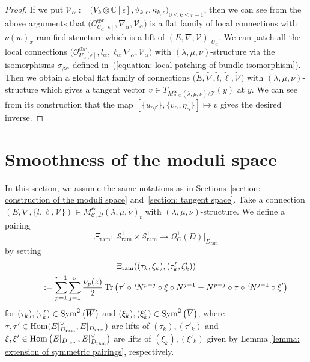 \documentclass[pdftex]{sigma}
\numberwithin{equation}{section}
\newcommand{\Tr}{\mathop{\rm Tr}\nolimits}
\newcommand\Hom{\mathop{\rm Hom}\nolimits}
\newcommand{\Sym}{\mathop{\rm Sym}\nolimits}
\newcommand{\balpha}{\boldsymbol \alpha}
\begin{document}
\begin{proof}
If we put
${\mathcal V}_{\alpha}:=
\big(\overline{V}_k\otimes\mathbb{C}[\epsilon],\vartheta_{k,\epsilon},\kappa_{k,\epsilon}\big)_{0\leq k\leq r-1}$,
then we can see from the above arguments that
$\big({\mathcal O}_{U_{\alpha}[\epsilon]}^{\oplus r} ,
\nabla_{\alpha} , {\mathcal V}_{\alpha}\big)$
is a flat family of local connections with $\nu(w)_x$-ramified structure which is a lift of
$(E,\nabla,{\mathcal V})|_{U_{\alpha}}$.
We can patch all the local connections
$\big({\mathcal O}_{U_{\alpha}[\epsilon]}^{\oplus r} ,l_{\alpha},\ell_{\alpha}
\nabla_{\alpha} , {\mathcal V}_{\alpha}\big)$
with $(\lambda,\mu,\nu)$-structure
via the isomorphisms $\sigma_{\beta\alpha}$
defined in~(\ref{equation: local patching of bundle isomorphism}).
Then we obtain a global flat family of connections
$\big(\tilde{E},\tilde{\nabla},\tilde{l},\tilde{\ell},\tilde{\mathcal V}\big)$
with $(\lambda,\mu,\nu)$-structure
which gives a tangent vector
$v\in T_{M^{\balpha}_{{\mathcal C},{\mathcal D}}(\lambda,\tilde{\mu},\tilde{\nu})/{\mathcal T}}(y)$
at $y$.
We can see from its construction that
the map
$[\{u_{\alpha\beta}\},\{v_{\alpha},\eta_{\alpha}\}]\mapsto v$
gives the desired inverse.
\end{proof}

\section{Smoothness of the moduli space}\label{section: smoothness of the moduli}

In this section, we assume the same notations as in
Sections~\ref{section: construction of the moduli space}
and~\ref{section: tangent space}.
Take a connection
$(E,\nabla,\{ l,\ell,{\mathcal V}\})
\in M^{\balpha}_{{\mathcal C},{\mathcal D}}(\lambda,\tilde{\mu},\tilde{\nu})_t$
with $(\lambda,\mu,\nu)$-structure.
We define a pairing
\[
 \Xi_{\mathrm{ram}} \colon \
 {\mathcal S}^1_{\mathrm{ram}} \times {\mathcal S}^1_{\mathrm{ram}}
 \longrightarrow \Omega^1_C(D)|_{D_{\mathrm{ram}}}
\]
by setting
\begin{gather}
 \Xi_{\mathrm{ram}} ( (\tau_k,\xi_k), (\tau'_k,\xi'_k) )\nonumber\\
\qquad{} :=
 \sum_{p=1}^{r-1}\sum_{j=1}^p
 \frac{\nu_p(z)}{2}
 \Tr\big( \tau' \circ \,^t\!N^{p-j} \circ \xi \circ N^{j-1}
 -N^{p-j} \circ \tau \circ \,^t\!N^{j-1} \circ \xi'
\big)\label{equation: definition of Xi}
\end{gather}
for $(\tau_k),(\tau'_k)\in \Sym^2\big(\overline{W}\big)$ and
$(\xi_k),(\xi'_k)\in \Sym^2\big(\overline{V}\big)$,
where $\tau,\tau'\in \Hom(E|_{D_{\mathrm{ram}}}^{\vee},E|_{D_{\mathrm{ram}}})$
are lifts of $(\tau_k),(\tau'_k)$
and $\xi,\xi'\in \Hom\big(E|_{D_{\mathrm{ram}}},E|_{D_{\mathrm{ram}}}^{\vee}\big)$
are lifts of $(\xi_k),(\xi'_k)$
given by Lemma \ref{lemma: extension of symmetric pairings},
respectively.
\end{document}
